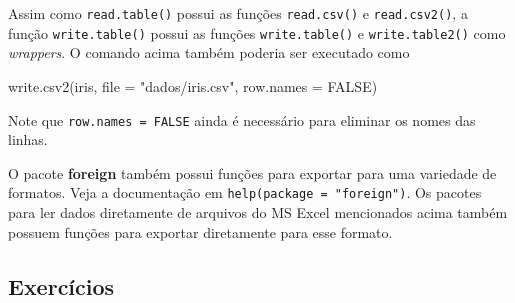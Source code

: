 \documentclass[
  10pt,
  a4paper]{book}
\newenvironment{Shaded}{\begin{snugshade}}{\end{snugshade}}
\newcommand{\AttributeTok}[1]{\textcolor[rgb]{0.77,0.63,0.00}{#1}}
\newcommand{\ConstantTok}[1]{\textcolor[rgb]{0.00,0.00,0.00}{#1}}
\newcommand{\FunctionTok}[1]{\textcolor[rgb]{0.00,0.00,0.00}{#1}}
\newcommand{\NormalTok}[1]{#1}
\newcommand{\StringTok}[1]{\textcolor[rgb]{0.31,0.60,0.02}{#1}}
\begin{document}
Assim como \texttt{read.table()} possui as funções \texttt{read.csv()} e
\texttt{read.csv2()}, a função \texttt{write.table()} possui as funções
\texttt{write.table()} e \texttt{write.table2()} como \emph{wrappers}. O comando acima
também poderia ser executado como

\begin{Shaded}
\begin{Highlighting}[]
\FunctionTok{write.csv2}\NormalTok{(iris, }\AttributeTok{file =} \StringTok{"dados/iris.csv"}\NormalTok{, }\AttributeTok{row.names =} \ConstantTok{FALSE}\NormalTok{)}
\end{Highlighting}
\end{Shaded}

Note que \texttt{row.names\ =\ FALSE} ainda é necessário para eliminar os nomes
das linhas.

O pacote \textbf{foreign} também possui funções para exportar para uma
variedade de formatos. Veja a documentação em \texttt{help(package\ =\ "foreign")}. Os pacotes para ler dados diretamente de arquivos do MS
Excel mencionados acima também possuem funções para exportar diretamente
para esse formato.

\hypertarget{exercuxedcios-11}{%
\subsection*{Exercícios}\label{exercuxedcios-11}}
\end{document}
